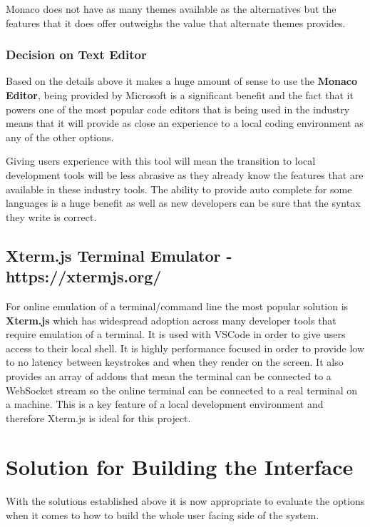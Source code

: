 Monaco does not have as many themes available as the alternatives but the features that it does offer outweighs the value that alternate themes provides.

\subsubsection{Decision on Text Editor}

Based on the details above it makes a huge amount of sense to use the \textbf{Monaco Editor}, being provided by Microsoft is a significant benefit and the fact that it powers one of the most popular code editors that is being used in the industry means that it will provide as close an experience to a local coding environment as any of the other options. 

Giving users experience with this tool will mean the transition to local development tools will be less abrasive as they already know the features that are available in these industry tools. The ability to provide auto complete for some languages is a huge benefit as well as new developers can be sure that the syntax they write is correct.

\subsection{Xterm.js Terminal Emulator - https://xtermjs.org/}

For online emulation of a terminal/command line the most popular solution is \textbf{Xterm.js} which has widespread adoption across many developer tools that require emulation of a terminal. It is used with VSCode in order to give users access to their local shell. It is highly performance focused in order to provide low to no latency between keystrokes and when they render on the screen. It also provides an array of addons that mean the terminal can be connected to a WebSocket stream so the online terminal can be connected to a real terminal on a machine. This is a key feature of a local development environment and therefore Xterm.js is ideal for this project.

\section{Solution for Building the Interface}

With the solutions established above it is now appropriate to evaluate the options when it comes to how to build the whole user facing side of the system.

